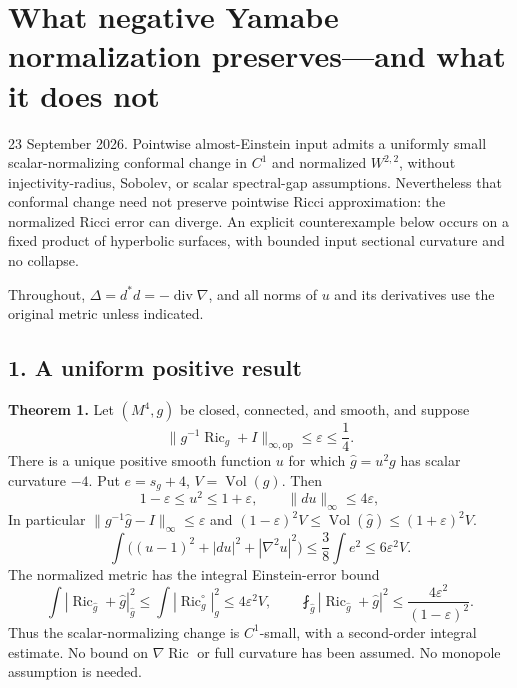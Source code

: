 \documentclass[
  11pt,
]{article}
\author{}
\date{23 September 2026}
\begin{document}
\hypertarget{what-negative-yamabe-normalization-preservesand-what-it-does-not}{%
\section{What negative Yamabe normalization preserves---and what it does
not}\label{what-negative-yamabe-normalization-preservesand-what-it-does-not}}

23 September 2026. Pointwise almost-Einstein input admits a uniformly
small scalar-normalizing conformal change in \(C^1\) and normalized
\(W^{2,2}\), without injectivity-radius, Sobolev, or scalar spectral-gap
assumptions. Nevertheless that conformal change need not preserve
pointwise Ricci approximation: the normalized Ricci error can diverge.
An explicit counterexample below occurs on a fixed product of hyperbolic
surfaces, with bounded input sectional curvature and no collapse.

Throughout, \(\Delta=d^*d=-\operatorname{div}\nabla\), and all norms of
\(u\) and its derivatives use the original metric unless indicated.

\hypertarget{a-uniform-positive-result}{%
\subsection{1. A uniform positive
result}\label{a-uniform-positive-result}}

\textbf{Theorem 1.} Let \((M^4,g)\) be closed, connected, and smooth,
and suppose \[
 \|g^{-1}\operatorname{Ric}_g+I\|_{\infty,\mathrm{op}}
 \le\varepsilon\le\frac14.
 \tag{1}
\] There is a unique positive smooth function \(u\) for which
\(\widehat g=u^2g\) has scalar curvature \(-4\). Put \(e=s_g+4\),
\(V=\operatorname{Vol}(g)\). Then \[
 1-\varepsilon\le u^2\le1+\varepsilon,
 \qquad \|du\|_\infty\le4\varepsilon,
 \tag{2}
\] In particular \(\|g^{-1}\widehat g-I\|_\infty\le\varepsilon\) and
\((1-\varepsilon)^2V\le\operatorname{Vol}(\widehat g) \le(1+\varepsilon)^2V\).
\[
 \int\bigl((u-1)^2+|du|^2+|\nabla^2u|^2\bigr)
 \le\frac38\int e^2\le6\varepsilon^2V.
 \tag{3}
\] The normalized metric has the integral Einstein-error bound \[
 \int|\operatorname{Ric}_{\widehat g}+\widehat g|^2_{\widehat g}
 \le\int|\operatorname{Ric}^{\circ}_g|^2_g
 \le4\varepsilon^2V,
 \qquad
 \fint_{\widehat g}|\operatorname{Ric}_{\widehat g}+\widehat g|^2
 \le\frac{4\varepsilon^2}{(1-\varepsilon)^2}.
 \tag{4}
\] Thus the scalar-normalizing change is \(C^1\)-small, with a
second-order integral estimate. No bound on \(\nabla\operatorname{Ric}\)
or full curvature has been assumed. No monopole assumption is needed.
\end{document}
